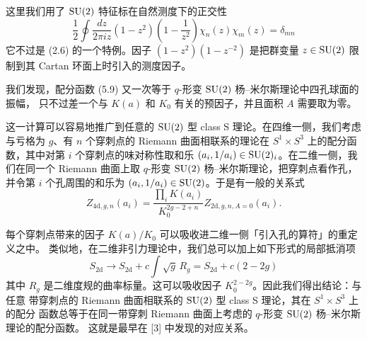 
这里我们用了 $\mathrm{SU}(2)$ 特征标在自然测度下的正交性
\begin{equation}
\frac{1}{2}\oint\frac{dz}{2\pi iz}(1-z^2)\left(1-\frac{1}{z^2}\right)\chi_n(z)\chi_m(z)=\delta_{mn}
\tag{5.10}
\end{equation}
它不过是 (2.6) 的一个特例。因子 $(1-z^2)(1-z^{-2})$ 是把群变量 $z\in\mathrm{SU}(2)$ 限制到其
Cartan 环面上时引入的测度因子。


我们发现，配分函数 (5.9) 又一次等于 $q$-形变 $\mathrm{SU}(2)$ 杨--米尔斯理论中四孔球面的振幅，
只不过差一个与 $K(a)$ 和 $K_0$ 有关的预因子，并且面积 $A$ 需要取为零。

这一计算可以容易地推广到任意的 $\mathrm{SU}(2)$ 型 class S 理论。在四维一侧，我们考虑与亏格为
$g$、有 $n$ 个穿刺点的 Riemann 曲面相联系的理论在 $S^1\times S^3$ 上的配分函数，其中对第
$i$ 个穿刺点的味对称性取和乐 $(a_i,1/a_i)\in\mathrm{SU}(2)_i$。在二维一侧，我们在同一个 Riemann
曲面上取 $q$-形变 $\mathrm{SU}(2)$ 杨--米尔斯理论，把穿刺点看作孔，并令第 $i$ 个孔周围的和乐为
$(a_i,1/a_i)\in\mathrm{SU}(2)$。于是有一般的关系式
\begin{equation}
Z_{4\mathrm{d},g,n}(a_i)=\frac{\prod_iK(a_i)}{K_0^{2g-2+n}}Z_{2\mathrm{d},g,n,A=0}(a_i).
\tag{5.11}
\end{equation}

每个穿刺点带来的因子 $K(a)/K_0$ 可以吸收进二维一侧「引入孔的算符」的重定义之中。
类似地，在二维非引力理论中，我们总可以加上如下形式的局部抵消项
\begin{equation}
S_{2\mathrm{d}}\to S_{2\mathrm{d}}+c\int\sqrt{g}\,R_g=S_{2\mathrm{d}}+c(2-2g)
\tag{5.12}
\end{equation}
其中 $R_g$ 是二维度规的曲率标量。这可以吸收因子 $K_0^{2-2g}$。因此我们得出结论：与任意
带穿刺点的 Riemann 曲面相联系的 $\mathrm{SU}(2)$ 型 class S 理论，其在 $S^1\times S^3$ 上的配分
函数总等于在同一带穿刺 Riemann 曲面上考虑的 $q$-形变 $\mathrm{SU}(2)$ 杨--米尔斯理论的配分函数。
这就是最早在 [3] 中发现的对应关系。

